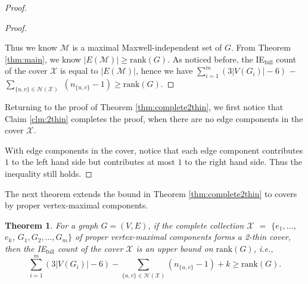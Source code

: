 \documentclass[10pt]{article}
\def\M{\mathcal {M}}
\def\H{\mathcal {H}}
\def\X{\mathcal {X}}
\newtheorem{thm}{Theorem}
\begin{document}
\begin{proof}
\begin{proof}
\begin{enumerate}[(I)]
\end{enumerate}

\medskip\noindent
Thus we know $\M$ is a maximal Maxwell-independent set of $G$. From Theorem \ref{thm:main}, we know $|E(\M)| \geq \text{rank}(G)$. As noticed before, the IE$_{\text{full}}$ count of the cover $\X$ is equal to $|E(\M)|$, hence we have
$\sum\limits_{i=1}^m{(3|V(G_i)| - 6)}$ $-$ $\sum\limits_{\{u, v\} \in \H(\X)}$ $(n_{\{u, v\}} -1) \geq \text{rank}(G)$. 

\end{proof}

Returning to the proof of Theorem \ref{thm:complete2thin}, we first notice that Claim \ref{clm:2thin} completes the proof, when there are no edge components in the cover $\X$.

With edge components in the cover, notice that each edge component contributes $1$ to the left hand side but contributes at most $1$ to the right hand side. Thus the inequality still holds.

\end{proof}


The next theorem extends the bound in Theorem \ref{thm:complete2thin} to covers by proper vertex-maximal components.

\begin{thm}\label{thm:properComplete2thin}
For a graph $G=(V, E)$, if the complete collection $\X$ $=$ $\{e_1, \ldots$, $e_k$, $G_1, G_2, \ldots, G_m\}$ of proper vertex-maximal components forms a 2-thin cover, then the IE$_{\text{full}}$ count of the cover $\X$ is an upper bound on $\text{rank}(G)$, i.e., $$\sum\limits_{i=1}^m{(3|V(G_i)| - 6)}  -  \sum\limits_{{\{u, v\}} \in \H(\X)}(n_{\{u, v\}}-1) +k \geq \text{rank}(G).$$
\end{thm}
\end{document}
